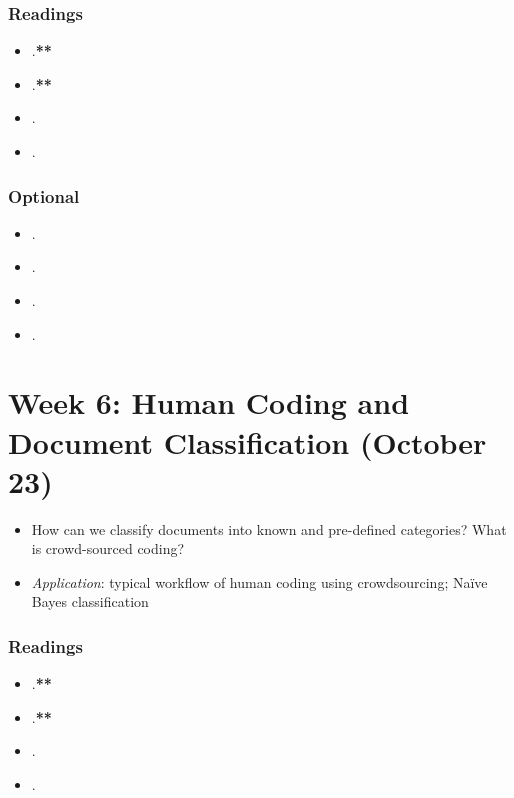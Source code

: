 \documentclass[abstract=on,parskip=full,headings=standardclasses,fontsize=11pt,paper=a4]{scrartcl}
\begin{document}
\subsubsection*{Readings}
\begin{itemize}
\item {}.\textbf{**}
\item {}.\textbf{**}
\item {}.
\item {}.
\end{itemize}

\subsubsection*{Optional}
\begin{itemize}
\item {}.
\item {}.
\item {}.
\item {}.
\end{itemize}


\section{Week 6: Human Coding and Document Classification (October 23)}

\begin{itemize}
\renewcommand\labelitemi{--}
\item How can we classify documents into known and pre-defined categories? What is crowd-sourced coding?
\item \textit{Application}: typical workflow of human coding using crowdsourcing; Naïve Bayes classification
\end{itemize}

\subsubsection*{Readings}
\begin{itemize}
\item {}.\textbf{**}
\item {}.\textbf{**}
\item {}.
\item {}.
\end{itemize}
\end{document}
